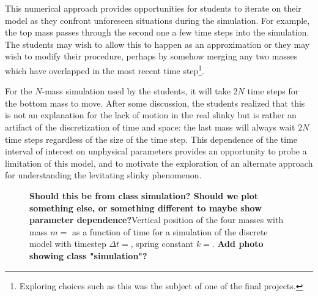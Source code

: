 \documentclass[pre,preprint,superscriptaddress,longbibliography]{revtex4-1}
\newcommand{\FIGdiscrete}{
\begin{figure}[t]\center
\caption{\label{fig:discrete} \textbf{Should this be from class simulation?  Should we plot something else, or something different to maybe show parameter dependence?}Vertical position of the four masses with mass $m=$ as a function of time for a simulation of the discrete model with timestep $\Delta t=$, spring constant $k=$.  \textbf{Add photo showing class "simulation"?}}
\end{figure}
}
\begin{document}
This numerical approach provides opportunities for students to iterate on their model as they confront unforeseen situations during the simulation. For example, the top mass passes through the second one a few time steps into the simulation.   %
The students may wish to allow this to happen as an approximation
or they may wish to modify their procedure, perhaps by somehow merging any two masses which have overlapped
in the most recent time step\footnote{Exploring choices such as this was the subject of one of the final projects.}.




For the $N$-mass simulation used by the students, it will take $2N$ time steps for the bottom mass to move.  After some discussion, the students realized that this is not an explanation for the lack of motion in the real slinky but is rather an artifact of the discretization of time and space:
the last mass will always wait $2N$ time steps regardless of the size of the time step. 
This dependence of the time interval of interest on unphysical parameters provides an opportunity to probe a limitation of this model, and to motivate the exploration of an alternate approach for understanding the levitating slinky phenomenon.
\FIGdiscrete
\end{document}
